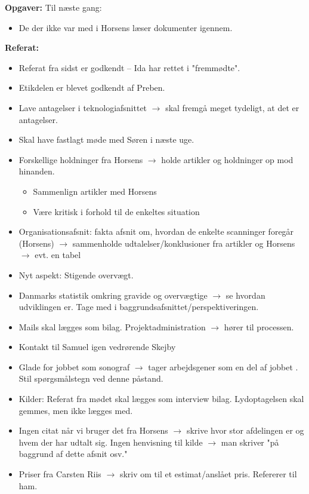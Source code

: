 \textbf{Opgaver:} \newline
Til næste gang:
\begin{itemize}
\item De der ikke var med i Horsens læser dokumenter igennem.
\end{itemize}
\textbf{Referat:}
\begin{itemize}
\item Referat fra sidst er godkendt – Ida har rettet i "fremmødte". 
\item Etikdelen er blevet godkendt af Preben. 
\item Lave antagelser i teknologiafsnittet $\rightarrow$ skal fremgå meget tydeligt, at det er antagelser. 
\item Skal have fastlagt møde med Søren i næste uge.
\item Forskellige holdninger fra Horsens $\rightarrow$ holde artikler og holdninger op mod hinanden. 
\begin{itemize}
\item Sammenlign artikler med Horsens
\item Være kritisk i forhold til de enkeltes situation
\end{itemize}
\item Organisationsafsnit: fakta afsnit om, hvordan de enkelte scanninger foregår (Horsens) $\rightarrow$ sammenholde udtalelser/konklusioner fra artikler og Horsens $\rightarrow$ evt. en tabel
\item Nyt aspekt: Stigende overvægt. 
\item Danmarks statistik omkring gravide og overvægtige $\rightarrow$ se hvordan udviklingen er. Tage med i baggrundsafsnittet/perspektiveringen. 
\item Mails skal lægges som bilag. Projektadministration $\rightarrow$ hører til processen. 
\item Kontakt til Samuel igen vedrørende Skejby
\item Glade for jobbet som sonograf $\rightarrow$ tager arbejdsgener som en del af jobbet . Stil spørgsmålstegn ved denne påstand.
\item Kilder: Referat fra mødet skal lægges som interview bilag. Lydoptagelsen skal gemmes, men ikke lægges med. 
\item Ingen citat når vi bruger det fra Horsens $\rightarrow$ skrive hvor stor afdelingen er og hvem der har udtalt sig. Ingen henvisning til kilde $\rightarrow$ man skriver "på baggrund af dette afsnit osv." 
\item Priser fra Carsten Riis $\rightarrow$ skriv om til et estimat/anslået pris. Refererer til ham.

\end{itemize}
